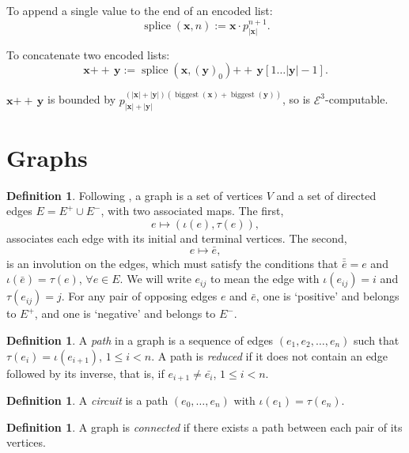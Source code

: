 \documentclass[a4paper]{article}
\newcommand{\grz}[1]{$\mathcal{E}^{#1}$}	%
\newcommand{\xvec}{\mathbf{x}}	%
\newcommand{\yvec}{\mathbf{y}}	%
\newcommand{\concat}{\ensuremath{+\!\!\!\!+\,}}	%
\theoremstyle{plain}
\theoremstyle{definition}
\newtheorem{definition}[theorem]{Definition}
\begin{document}
To append a single value to the end of an encoded list:
\begin{equation} \operatorname{splice}(\xvec,n) := \xvec \cdot p_{|\xvec|}^{n+1}. \end{equation}

To concatenate two encoded lists:
\begin{equation} \xvec \concat \yvec := \operatorname{splice}(\xvec,(\yvec)_0) \concat \yvec[1 \dots |\yvec|-1]. \end{equation}

$\xvec \concat \yvec$ is bounded by $p_{|\xvec|+|\yvec|}^{(|\xvec|+|\yvec|) (\operatorname{biggest}(\xvec)+\operatorname{biggest}(\yvec))}$, so is \grz{3}-computable.

\section{Graphs \label{graphs}}

\begin{definition}
	Following \cite{Serre_1977}, a graph is a set of vertices $V$ and a set of directed edges $E = E^+ \cup E^-$, with two associated maps. The first,
\[ e \mapsto (\iota(e), \tau(e)), \]
associates each edge with its initial and terminal vertices. The second,
\[ e \mapsto \bar{e}, \]
is an involution on the edges, which must satisfy the conditions that $\bar{\bar{e}} = e$ and $\iota(\bar{e}) = \tau(e)$, $\forall e \in E$. We will write $e_{ij}$ to mean the edge with $\iota(e_{ij}) = i$ and $\tau(e_{ij})=j$. For any pair of opposing edges $e$ and $\bar{e}$, one is `positive' and belongs to $E^+$, and one is `negative' and belongs to $E^-$.
\end{definition}

\begin{definition}
A {\it path} in a graph is a sequence of edges $(e_1, e_2, \dots, e_n)$ such that $\tau(e_i) = \iota(e_{i+1})$, $1 \leq i < n$. A path is {\it reduced} if it does not contain an edge followed by its inverse, that is, if $e_{i+1} \neq \bar{e_i}$, $1 \leq i < n$. 
\end{definition}

\begin{definition}
A {\it circuit} is a path $(e_0, \dots, e_n)$ with $\iota(e_1) = \tau(e_n)$. 
\end{definition}

\begin{definition}
A graph is {\it connected} if there exists a path between each pair of its vertices.
\end{definition}
\end{document}
